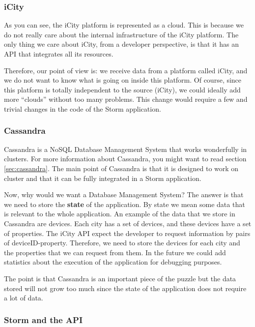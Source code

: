 \subsubsection*{iCity}

As you can see, the iCity platform is represented as a cloud. This is because
we do not really care about the internal infrastructure of the iCity platform.
The only thing we care about iCity, from a developer perspective, is that it
has an API that integrates all its resources.

Therefore, our point of view is: we receive data from a platform called iCity,
and we do not want to know what is going on inside this platform. Of course,
since this platform is totally independent to the source (iCity), we could
ideally add more ``clouds'' without too many problems. This change would
require a few and trivial changes in the code of the Storm application.

\subsubsection*{Cassandra}

Cassandra is a NoSQL Database Management System that works wonderfully in
clusters. For more information about Cassandra, you might want to read
section \ref{sec:cassandra}. The main point of Cassandra is that it is designed
to work on cluster and that it can be fully integrated in a Storm application.

Now, why would we want a Database Management System? The answer is that we need
to store the {\bf state} of the application. By state we mean some data that is
relevant to the whole application. An example of the data that we store in
Cassandra are devices. Each city has a set of devices, and these devices have a
set of properties. The iCity API expect the developer to request information by
pairs of deviceID-property. Therefore, we need to store the devices for each
city and the properties that we can request from them. In the future we could
add statistics about the execution of the application for debugging purposes.

The point is that Cassandra is an important piece of the puzzle but the data
stored will not grow too much since the state of the application does not
require a lot of data.

\subsubsection*{Storm and the API}

